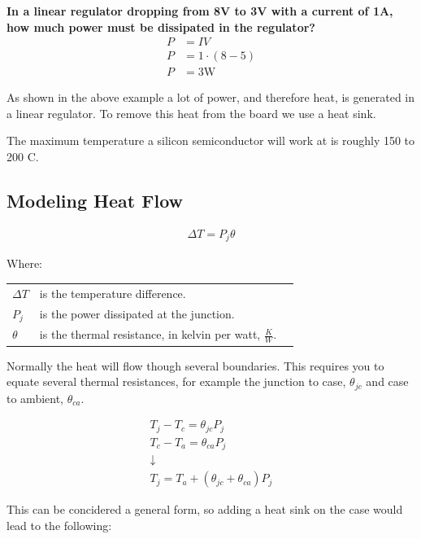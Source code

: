 \begin{framed}
\textbf{In a linear regulator dropping from 8V to 3V with a current of 1A, how much power must be dissipated in the regulator?}
\begin{align*}
P &= IV \\
P &= 1\cdot(8-5) \\
P &= 3\textrm{W}
\end{align*}
\end{framed}

As shown in the above example a lot of power, and therefore heat, is generated in a linear regulator. To remove this heat from the board we use a heat sink.

The maximum temperature a silicon semiconductor will work at is roughly 150 to 200 \degree C.

\subsection{Modeling Heat Flow}

\begin{align*}
\Delta T = P_j \theta
\end{align*}

Where:

\begin{table}[H]
	\centering
    \begin{tabular}{lll}
    $\Delta T$ & is the temperature difference. \\
    $P_j$      & is the power dissipated at the junction. \\
    $\theta$   & is the thermal resistance, in kelvin per watt, $\frac{K}{W}$. \\
    \end{tabular}
\end{table}

Normally the heat will flow though several boundaries. This requires you to equate several thermal resistances, for example the junction to case, $\theta_{jc}$ and case to ambient, $\theta_{ca}$.

\begin{gather*}
T_j - T_c = \theta_{jc}P_j \\
T_c - T_a = \theta_{ca}P_j \\
\downarrow \\
T_j = T_a + (\theta_{jc} + \theta_{ca})P_j
\end{gather*}

This can be concidered a general form, so adding a heat sink on the case would lead to the following:

